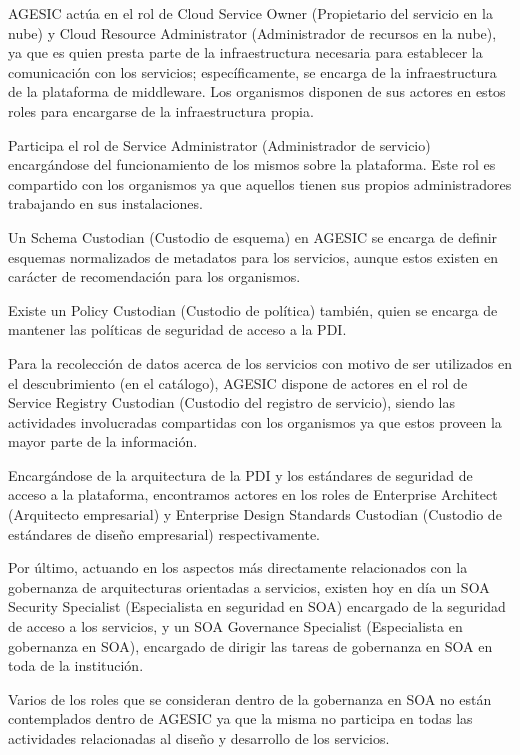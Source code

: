 AGESIC actúa en el rol de Cloud Service Owner (Propietario del servicio en la nube) y Cloud Resource Administrator (Administrador de recursos en la nube), ya que es quien presta parte de la infraestructura necesaria para establecer la comunicación con los servicios; específicamente, se encarga de la infraestructura de la plataforma de middleware. Los organismos disponen de sus actores en estos roles para encargarse de la infraestructura propia.

Participa el rol de Service Administrator (Administrador de servicio) encargándose del funcionamiento de los mismos sobre la plataforma. Este rol es compartido con los organismos ya que aquellos tienen sus propios administradores trabajando en sus instalaciones.

Un Schema Custodian (Custodio de esquema) en AGESIC se encarga de definir esquemas normalizados de metadatos para los servicios, aunque estos existen en carácter de recomendación para los organismos.

Existe un Policy Custodian (Custodio de política) también, quien se encarga de mantener las políticas de seguridad de acceso a la PDI.

Para la recolección de datos acerca de los servicios con motivo de ser utilizados en el descubrimiento (en el catálogo), AGESIC dispone de actores en el rol de Service Registry Custodian (Custodio del registro de servicio), siendo las actividades involucradas compartidas con los organismos ya que estos proveen la mayor parte de la información.

Encargándose de la arquitectura de la PDI y los estándares de seguridad de acceso a la plataforma, encontramos actores en los roles de Enterprise Architect (Arquitecto empresarial) y Enterprise Design Standards Custodian (Custodio de estándares de diseño empresarial) respectivamente.

Por último, actuando en los aspectos más directamente relacionados con la gobernanza de arquitecturas orientadas a servicios, existen hoy en día un SOA Security Specialist (Especialista en seguridad en SOA) encargado de la seguridad de acceso a los servicios, y un SOA Governance Specialist (Especialista en gobernanza en SOA), encargado de dirigir las tareas de gobernanza en SOA en toda de la institución.

Varios de los roles que se consideran dentro de la gobernanza en SOA no están contemplados dentro de AGESIC ya que la misma no participa en todas las actividades relacionadas al diseño y desarrollo de los servicios. 

